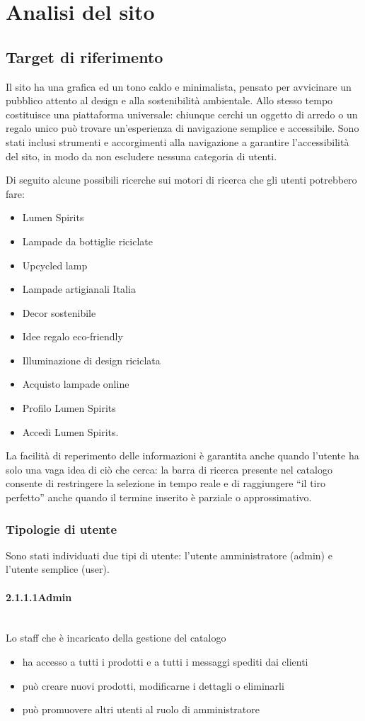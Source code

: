 \documentclass[11pt,a4paper]{article}
\newcommand{\subsubsubsection}[1]{\paragraph{#1}\mbox{}\\}
\begin{document}
\section{Analisi del sito}

\subsection{Target di riferimento}
Il sito ha una grafica ed un tono caldo e minimalista, pensato per avvicinare un pubblico attento al design e alla sostenibilit\`a ambientale. Allo stesso tempo costituisce una piattaforma universale: chiunque cerchi un oggetto di arredo o un regalo unico pu\`o trovare un'esperienza di navigazione semplice e accessibile. Sono stati inclusi strumenti e accorgimenti alla navigazione a garantire l'accessibilit\`a del sito, in modo da non escludere nessuna categoria di utenti.

Di seguito alcune possibili ricerche sui motori di ricerca che gli utenti potrebbero fare:
\begin{itemize}
  \item Lumen Spirits
  \item Lampade da bottiglie riciclate
  \item Upcycled lamp
  \item Lampade artigianali Italia
  \item Decor sostenibile
  \item Idee regalo eco-friendly
  \item Illuminazione di design riciclata
  \item Acquisto lampade online
  \item Profilo Lumen Spirits
  \item Accedi Lumen Spirits.
\end{itemize}

La facilit\`a di reperimento delle informazioni \`e garantita anche quando l'utente ha solo una vaga idea di ci\`o che cerca: la barra di ricerca presente nel catalogo consente di restringere la selezione in tempo reale e di raggiungere ``il tiro perfetto'' anche quando il termine inserito \`e parziale o approssimativo.

\subsubsection{Tipologie di utente}
Sono stati individuati due tipi di utente: l'utente amministratore (admin) e l'utente semplice (user).

\subsubsubsection{2.1.1.1\quad Admin}
Lo staff che è incaricato della gestione del catalogo
\begin{itemize}
  \item ha accesso a tutti i prodotti e a tutti i messaggi spediti dai clienti
  \item pu\`o creare nuovi prodotti, modificarne i dettagli o eliminarli
  \item pu\`o promuovere altri utenti al ruolo di amministratore
\end{itemize}
\end{document}
